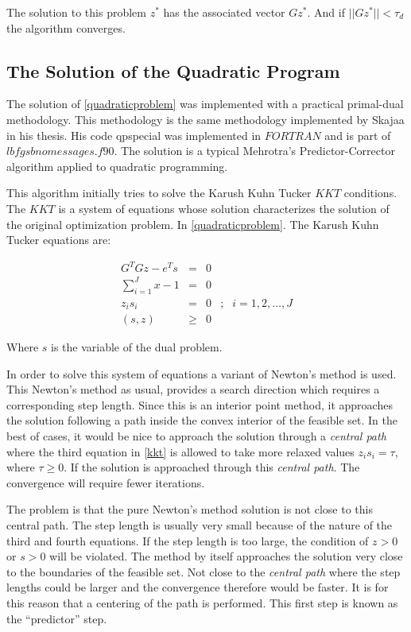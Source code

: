 The solution to this problem $z^*$ has the associated vector $Gz^*$. And if $||Gz^*|| < \tau_d$ the algorithm converges.

\subsection{The Solution of the Quadratic Program}

The solution of \ref{quadraticproblem} was implemented with a practical primal-dual methodology. This methodology is the same methodology implemented by Skajaa \citep{skaaja} in his thesis. His code qpspecial was implemented in $FORTRAN$ and is part of $lbfgsbnomessages.f90$. The solution is a typical Mehrotra's Predictor-Corrector algorithm applied to quadratic programming.

This algorithm initially tries to solve the Karush Kuhn Tucker $KKT$ conditions. The $KKT$ is a system of equations whose solution characterizes the solution of the original optimization problem. In \ref{quadraticproblem}. The Karush Kuhn Tucker equations are:

\begin{equation} \label{kkt}
  \begin{aligned}
    G^TGz - e^Ts
    & = & 0 & \\
    \sum_{i = 1}^J x - 1
    & = & 0 & \\
    z_is_i & = & 0 &; &i = 1,2, \dots, J\\
    (s, z) & \geq & 0 &
  \end{aligned}
\end{equation}

Where $s$ is the variable of the dual problem.

In order to solve this system of equations a variant of Newton's method is used. This Newton's method as usual, provides a search direction which requires a corresponding step length.  Since this is an interior point method, it approaches the solution following a path inside the convex interior of the feasible set.  In the best of cases, it would be nice to approach the solution through a \emph{central path} where the third equation in \ref{kkt} is allowed to take more relaxed values $z_is_i = \tau$, where $\tau \geq 0$. If the solution is approached through this \emph{central path}. The convergence will require fewer iterations.

The problem is that the pure Newton's method solution is not close to this central path. The step length is usually very small because of the nature of the third and fourth equations. If the step length is too large, the condition of $z > 0$ or $s > 0$ will be violated. The method by itself approaches the solution very close to the boundaries of the feasible set. Not close to the \emph{central path} where the step lengths could be larger and the convergence therefore would be faster.  It is for this reason that a centering of the path is performed. This first step is known as the ``predictor'' step.


